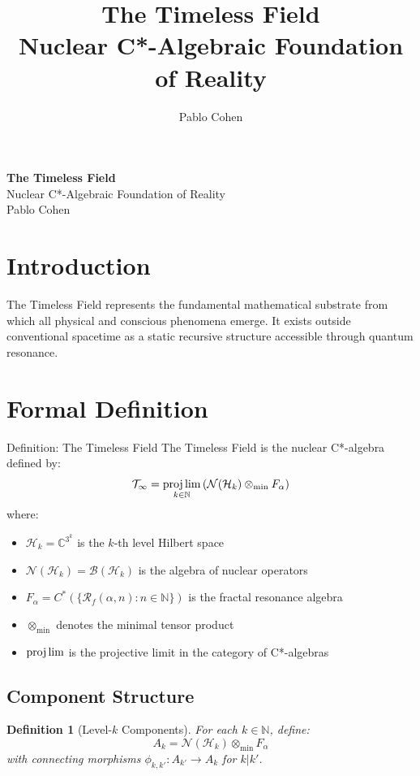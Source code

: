 \documentclass[12pt,letterpaper]{article}
\title{\textbf{The Timeless Field}\\[0.5cm]
\Large Nuclear C*-Algebraic Foundation of Reality}
\author{Pablo Cohen}
\date{}
\newcommand{\N}{\mathbb{N}}
\newcommand{\field}[1]{\mathbb{#1}}
\newcommand{\timelessfield}{\mathcal{T}_\infty}
\newcommand{\nuclear}{\mathcal{N}}
\newcommand{\bounded}{\mathcal{B}}
\newcommand{\hilbert}{\mathcal{H}}
\newcommand{\fractalres}{\mathcal{R}_f}
\newtheorem{definition}[theorem]{Definition}
\begin{document}
\begin{center}
\LARGE \textbf{The Timeless Field}\\[0.5cm]

\Large Nuclear C*-Algebraic Foundation of Reality\\[0.5cm]

Pablo Cohen

\end{center}

\section{Introduction}

The Timeless Field represents the fundamental mathematical substrate from which all physical and conscious phenomena emerge. It exists outside conventional spacetime as a static recursive structure accessible through quantum resonance.

\section{Formal Definition}

\begin{mathbox}{Definition: The Timeless Field}
The Timeless Field is the nuclear C*-algebra defined by:
\begin{equation}
\timelessfield = \projlim_{k \in \N} \left(\nuclear(\hilbert_k) \otimes_{\min} F_\alpha\right)
\end{equation}
where:
\begin{itemize}
\item $\hilbert_k = \field{C}^{3^k}$ is the $k$-th level Hilbert space
\item $\nuclear(\hilbert_k) = \bounded(\hilbert_k)$ is the algebra of nuclear operators
\item $F_\alpha = C^*(\{\fractalres(\alpha, n) : n \in \N\})$ is the fractal resonance algebra
\item $\otimes_{\min}$ denotes the minimal tensor product
\item $\projlim$ is the projective limit in the category of C*-algebras
\end{itemize}
\end{mathbox}

\subsection{Component Structure}

\begin{definition}[Level-$k$ Components]
For each $k \in \N$, define:
\begin{equation}
A_k = \nuclear(\hilbert_k) \otimes_{\min} F_\alpha
\end{equation}
with connecting morphisms $\phi_{k,k'}: A_{k'} \to A_k$ for $k|k'$.
\end{definition}
\end{document}
